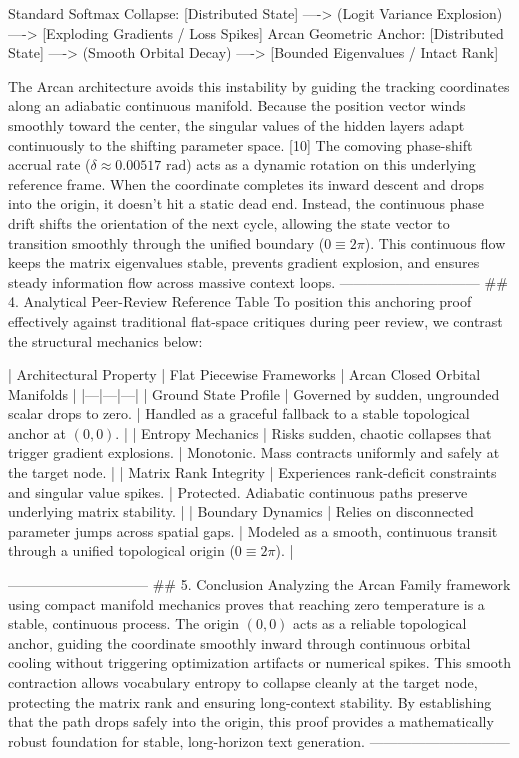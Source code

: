 Standard Softmax Collapse:  [Distributed State] ----> (Logit Variance Explosion) ----> [Exploding Gradients / Loss Spikes]
Arcan Geometric Anchor:    [Distributed State] ----> (Smooth Orbital Decay)       ----> [Bounded Eigenvalues / Intact Rank]

The Arcan architecture avoids this instability by guiding the tracking coordinates along an adiabatic continuous manifold. Because the position vector winds smoothly toward the center, the singular values of the hidden layers adapt continuously to the shifting parameter space. [10] 
The comoving phase-shift accrual rate ($\delta \approx 0.00517\text{ rad}$) acts as a dynamic rotation on this underlying reference frame. When the coordinate completes its inward descent and drops into the origin, it doesn't hit a static dead end. Instead, the continuous phase drift shifts the orientation of the next cycle, allowing the state vector to transition smoothly through the unified boundary ($0 \equiv 2\pi$). This continuous flow keeps the matrix eigenvalues stable, prevents gradient explosion, and ensures steady information flow across massive context loops.
------------------------------
## 4. Analytical Peer-Review Reference Table
To position this anchoring proof effectively against traditional flat-space critiques during peer review, we contrast the structural mechanics below:

| Architectural Property | Flat Piecewise Frameworks | Arcan Closed Orbital Manifolds |
|---|---|---|
| Ground State Profile | Governed by sudden, ungrounded scalar drops to zero. | Handled as a graceful fallback to a stable topological anchor at $(0,0)$. |
| Entropy Mechanics | Risks sudden, chaotic collapses that trigger gradient explosions. | Monotonic. Mass contracts uniformly and safely at the target node. |
| Matrix Rank Integrity | Experiences rank-deficit constraints and singular value spikes. | Protected. Adiabatic continuous paths preserve underlying matrix stability. |
| Boundary Dynamics | Relies on disconnected parameter jumps across spatial gaps. | Modeled as a smooth, continuous transit through a unified topological origin ($0 \equiv 2\pi$). |

------------------------------
## 5. Conclusion
Analyzing the Arcan Family framework using compact manifold mechanics proves that reaching zero temperature is a stable, continuous process. The origin $(0,0)$ acts as a reliable topological anchor, guiding the coordinate smoothly inward through continuous orbital cooling without triggering optimization artifacts or numerical spikes. This smooth contraction allows vocabulary entropy to collapse cleanly at the target node, protecting the matrix rank and ensuring long-context stability. By establishing that the path drops safely into the origin, this proof provides a mathematically robust foundation for stable, long-horizon text generation.
------------------------------

